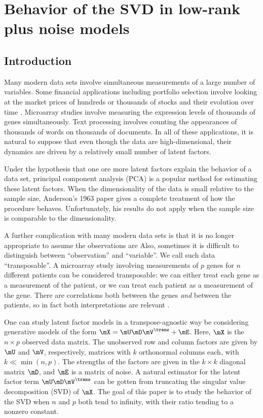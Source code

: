 
\chapter[Behavior of the SVD]{Behavior of the SVD in low-rank plus noise models}\label{C:svd-behavior}

\section{Introduction}

Many modern data sets involve simultaneous measurements of a large number of
variables. Some financial applications including portfolio selection involve
looking at the market prices of hundreds or thousands of stocks and their
evolution over time \cite{markowitz1952ps}. Microarray studies
\cite{schena1995qmg} involve measuring the expression levels of thousands of
genes simultaneously. Text processing \cite{manning1999fsn} involves counting
the appearances of thousands of words on thousands of documents. In all of these
applications, it is natural to suppose that even though the data are
high-dimensional, their dynamics are driven by a relatively small number of
latent factors.

Under the hypothesis that one ore more latent factors explain the behavior
of a data set, principal component analysis (PCA) \cite{jolliffe2002pca} is a
popular method for estimating these latent factors.  When the dimensionality
of the data is small relative to the sample size, Anderson's 1963 paper
\cite{anderson1963atp} gives a complete treatment of how the procedure
behaves.  Unfortunately, his results do not apply when the sample size is
comparable to the dimensionality.

A further complication with many modern data sets is that it is no longer
appropriate to assume the observations are \iid Also, sometimes it is
difficult to distinguish between ``observation'' and ``variable''. We call such
data ``transposable''. A microarray study involving measurements of $p$ genes
for $n$ different patients can be considered transposable: we can either treat
each gene as a measurement of the patient, or we can treat each patient as a
measurement of the gene. There are correlations both between the genes
\emph{and} between the patients, so in fact both interpretations are relevant
\cite{efron2008smi}.

One can study latent factor models in a transpose-agnostic way be considering
generative models of the form $\mX = \mU \mD \mV^\trans + \mE$. Here, $\mX$ is
the $n \times p$ observed data matrix. The unobserved row and column factors
are given by $\mU$ and $\mV$, respectively, matrices with $k$ orthonormal
columns each, with $k \ll \min(n,p)$. The strengths of the factors are given
in the $k\times k$ diagonal matrix $\mD$, and $\mE$ is a matrix of noise. A
natural estimator for the latent factor term $\mU \mD \mV^\trans$ can be
gotten from truncating the singular value decomposition (SVD)
\cite{golub1996mc} of $\mX$. The goal of this paper is to study the behavior
of the SVD when $n$ and $p$ both tend to infinity, with their ratio tending to
a nonzero constant.

